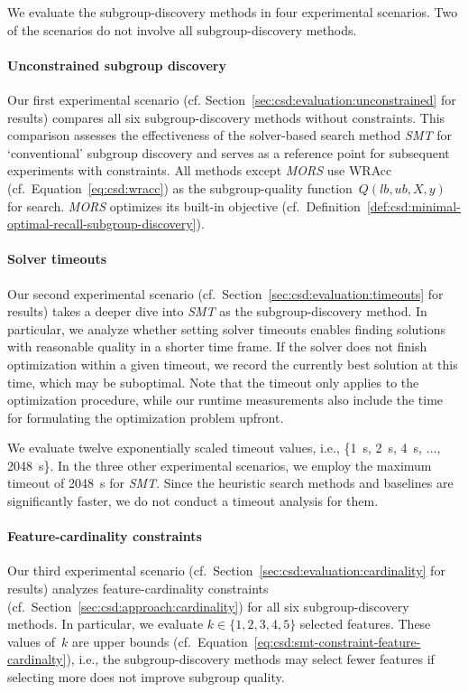 \documentclass{article}
\theoremstyle{definition}
\begin{document}
We evaluate the subgroup-discovery methods in four experimental scenarios.
Two of the scenarios do not involve all subgroup-discovery methods.

\paragraph{Unconstrained subgroup discovery}

Our first experimental scenario (cf. Section~\ref{sec:csd:evaluation:unconstrained} for results) compares all six subgroup-discovery methods without constraints.
This comparison assesses the effectiveness of the solver-based search method \emph{SMT} for `conventional' subgroup discovery and serves as a reference point for subsequent experiments with constraints.
All methods except \emph{MORS} use WRAcc (cf.~Equation~\ref{eq:csd:wracc}) as the subgroup-quality function~$Q(\mathit{lb}, \mathit{ub}, X, y)$ for search.
\emph{MORS} optimizes its built-in objective (cf.~Definition~\ref{def:csd:minimal-optimal-recall-subgroup-discovery}).

\paragraph{Solver timeouts}

Our second experimental scenario (cf.~Section~\ref{sec:csd:evaluation:timeouts} for results) takes a deeper dive into \emph{SMT} as the subgroup-discovery method.
In particular, we analyze whether setting solver timeouts enables finding solutions with reasonable quality in a shorter time frame.
If the solver does not finish optimization within a given timeout, we record the currently best solution at this time, which may be suboptimal.
Note that the timeout only applies to the optimization procedure, while our runtime measurements also include the time for formulating the optimization problem upfront.

We evaluate twelve exponentially scaled timeout values, i.e., \{1~s, 2~s, 4~s, $\dots$, 2048~s\}.
In the three other experimental scenarios, we employ the maximum timeout of 2048~s for \emph{SMT}.
Since the heuristic search methods and baselines are significantly faster, we do not conduct a timeout analysis for them.

\paragraph{Feature-cardinality constraints}

Our third experimental scenario (cf.~Section~\ref{sec:csd:evaluation:cardinality} for results) analyzes feature-cardinality constraints (cf.~Section~\ref{sec:csd:approach:cardinality}) for all six subgroup-discovery methods.
In particular, we evaluate $k \in \{1, 2, 3, 4, 5\}$ selected features.
These values of~$k$ are upper bounds (cf.~Equation~\ref{eq:csd:smt-constraint-feature-cardinalty}), i.e., the subgroup-discovery methods may select fewer features if selecting more does not improve subgroup quality.
\end{document}

